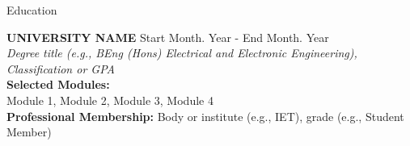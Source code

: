 \begin{rSection}{\normalsize Education}

{\bf UNIVERSITY NAME} \hfill {Start Month. Year - End Month. Year}
\\
\textit{Degree title (e.g., BEng (Hons) Electrical and Electronic Engineering), Classification or GPA}
\\
\textbf{Selected Modules:}
\\
Module 1, Module 2, Module 3, Module 4
\vspace{0.1cm}
\\
\textbf{Professional Membership:} Body or institute (e.g., IET), grade (e.g., Student Member)
\end{rSection}
\vspace{-0.2cm}
